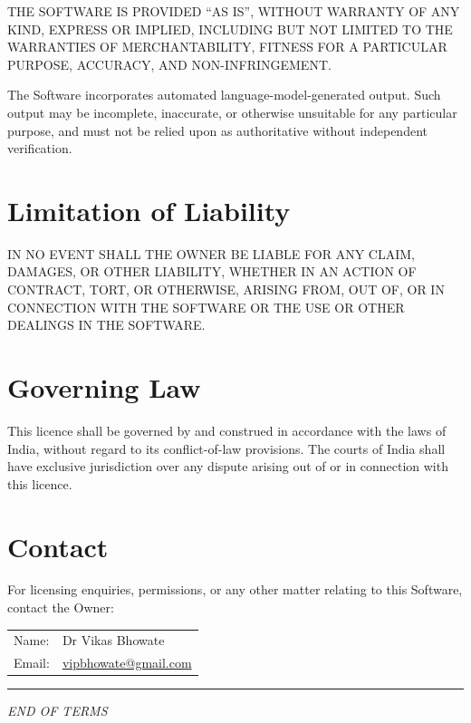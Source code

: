 \documentclass[11pt,a4paper]{article}
\begin{document}
THE SOFTWARE IS PROVIDED ``AS IS'', WITHOUT WARRANTY OF ANY KIND, EXPRESS OR
IMPLIED, INCLUDING BUT NOT LIMITED TO THE WARRANTIES OF MERCHANTABILITY,
FITNESS FOR A PARTICULAR PURPOSE, ACCURACY, AND NON-INFRINGEMENT.

The Software incorporates automated language-model-generated output. Such
output may be incomplete, inaccurate, or otherwise unsuitable for any
particular purpose, and must not be relied upon as authoritative without
independent verification.

\section{Limitation of Liability}

IN NO EVENT SHALL THE OWNER BE LIABLE FOR ANY CLAIM, DAMAGES, OR OTHER
LIABILITY, WHETHER IN AN ACTION OF CONTRACT, TORT, OR OTHERWISE, ARISING
FROM, OUT OF, OR IN CONNECTION WITH THE SOFTWARE OR THE USE OR OTHER
DEALINGS IN THE SOFTWARE.

\section{Governing Law}

This licence shall be governed by and construed in accordance with the laws
of India, without regard to its conflict-of-law provisions. The courts of
India shall have exclusive jurisdiction over any dispute arising out of or
in connection with this licence.

\section{Contact}

For licensing enquiries, permissions, or any other matter relating to this
Software, contact the Owner:

\begin{center}
\begin{tabular}{ll}
    Name:  & Dr Vikas Bhowate \\
    Email: & \href{mailto:vipbhowate@gmail.com}{vipbhowate@gmail.com} \\
\end{tabular}
\end{center}

\vspace{2em}
\noindent\rule{\linewidth}{0.6pt}

\begin{center}
    \small \itshape END OF TERMS
\end{center}
\end{document}
